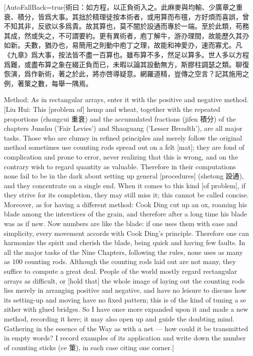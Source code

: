 \documentclass[11pt]{article}
\newcommand{\zhsmall}{\footnotesize\color{black!70}}
\newcommand{\unitlabel}[1]{\marginpar{\raggedleft\tiny\color{gray}#1}}
\newenvironment{unitzh}{\par\CJKfontspec{Noto Serif CJK SC}[AutoFallBack=true]\large\linespread{1.25}\selectfont}{\par}
\newenvironment{uniten}{\par\small\color{black!85}}{\par\medskip}
\begin{document}
\begin{unitzh}\unitlabel{jiuzhang-035.12}術曰：如方程，以正負術入之。{\zhsmall 此麻麥與均輸、少廣章之重衰、積分，皆爲大事。其拙於精理徒按本術者，或用算而布氊，方好煩而喜誤，曾不知其非，反欲以多爲貴。故其算也，莫不闇於設通而專於一端。至於此類，苟務其成，然或失之，不可謂要約。更有異術者，庖丁解牛，游刅理間，故能歷久其刅如新。夫數，猶刅也，易簡用之則動中庖丁之理，故能和神愛刅，速而寡尤。凡《九章》爲大事，按法皆不盡一百算也。雖布算不多，然足以算多。世人多以方程爲難，或盡布算之象在綴正負而已，未暇以論其設動無方，斯膠柱調瑟之類。聊復恢演，爲作新術，著之於此，將亦啓導疑意。網羅道精，豈傳之空言？記其施用之例，著䇿之數，每舉一隅焉。}\end{unitzh}
\begin{uniten}Method: As in rectangular arrays, enter it with the positive and negative method. [Liu Hui: This [problem of] hemp and wheat, together with the repeated proportions (chongcui 重衰) and the accumulated fractions (jifen 積分) of the chapters Junshu ('Fair Levies') and Shaoguang ('Lesser Breadth'), are all major tasks. Those who are clumsy in refined principles and merely follow the original method sometimes use counting rods spread out on a felt [mat]; they are fond of complication and prone to error, never realizing that this is wrong, and on the contrary wish to regard quantity as valuable. Therefore in their computations none fail to be in the dark about setting up general [procedures] (shetong 設通), and they concentrate on a single end. When it comes to this kind [of problem], if they strive for its completion, they may still miss it; this cannot be called concise. Moreover, as for having a different method: Cook Ding cut up an ox, roaming his blade among the interstices of the grain, and therefore after a long time his blade was as if new. Now numbers are like the blade: if one uses them with ease and simplicity, every movement accords with Cook Ding's principle. Therefore one can harmonize the spirit and cherish the blade, being quick and having few faults. In all the major tasks of the Nine Chapters, following the rules, none uses as many as 100 counting rods. Although the counting rods laid out are not many, they suffice to compute a great deal. People of the world mostly regard rectangular arrays as difficult, or [hold that] the whole image of laying out the counting rods lies merely in arranging positive and negative, and have no leisure to discuss how its setting-up and moving have no fixed pattern; this is of the kind of tuning a se zither with glued bridges. So I have once more expanded upon it and made a new method, recording it here; it may also open up and guide the doubting mind. Gathering in the essence of the Way as with a net — how could it be transmitted in empty words? I record examples of its application and write down the number of counting sticks (ce 䇿), in each case citing one corner.]\end{uniten}
\end{document}
